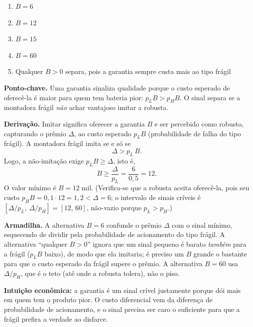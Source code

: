 \begin{enumerate}[label=\Alph*., leftmargin=3.2em, itemsep=0.15em, topsep=0.2em]
  \item $B=6$
  \item $B=12$
  \item $B=15$
  \item $B=60$
  \item Qualquer $B>0$ separa, pois a garantia sempre custa mais ao tipo frágil
\end{enumerate}
\begin{solucao}
\textbf{Ponto-chave.} Uma garantia sinaliza qualidade porque o custo esperado de oferecê-la é maior para quem tem bateria pior: $p_L B > p_H B$. O sinal separa se a montadora frágil \emph{não} achar vantajoso imitar a robusta.

\textbf{Derivação.} Imitar significa oferecer a garantia $B$ e ser percebido como robusto, capturando o prêmio $\Delta$, ao custo esperado $p_L B$ (probabilidade de falha do tipo frágil). A montadora frágil imita se e só se
\[
\Delta > p_L\,B.
\]
Logo, a não-imitação exige $p_L B \ge \Delta$, isto é,
\[
B \ge \frac{\Delta}{p_L} = \frac{6}{0{,}5} = 12.
\]
O valor mínimo é $B=12$ mil. (Verifica-se que a robusta aceita oferecê-la, pois seu custo $p_H B = 0{,}1\cdot 12 = 1{,}2 < \Delta = 6$; o intervalo de sinais críveis é $[\Delta/p_L,\ \Delta/p_H]=[12,\,60]$, não-vazio porque $p_L>p_H$.)

\textbf{Armadilha.} A alternativa $B=6$ confunde o prêmio $\Delta$ com o sinal mínimo, esquecendo de dividir pela probabilidade de acionamento do tipo frágil. A alternativa ``qualquer $B>0$'' ignora que um sinal pequeno é barato \emph{também} para a frágil ($p_L B$ baixo), de modo que ela imitaria; é preciso um $B$ grande o bastante para que o custo esperado da frágil supere o prêmio. A alternativa $B=60$ usa $\Delta/p_H$, que é o teto (até onde a robusta tolera), não o piso.

\textbf{Intuição econômica:} a garantia é um sinal crível justamente porque dói mais em quem tem o produto pior. O custo diferencial vem da diferença de probabilidade de acionamento, e o sinal precisa ser caro o suficiente para que a frágil prefira a verdade ao disfarce.
\end{solucao}

